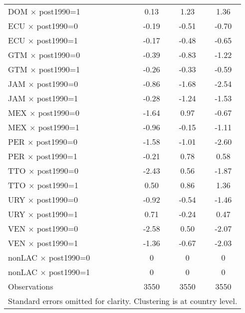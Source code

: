 \begin{table}[htbp]
\begin{tabular}{l*{3}{c}}
DOM $\times$ post1990=1&     0.13         &     1.23\sym{***}&     1.36\sym{***}\\
ECU $\times$ post1990=0&    -0.19         &    -0.51\sym{**} &    -0.70\sym{**} \\
ECU $\times$ post1990=1&    -0.17         &    -0.48\sym{**} &    -0.65\sym{***}\\
GTM $\times$ post1990=0&    -0.39\sym{*}  &    -0.83\sym{***}&    -1.22\sym{***}\\
GTM $\times$ post1990=1&    -0.26\sym{*}  &    -0.33         &    -0.59\sym{**} \\
JAM $\times$ post1990=0&    -0.86\sym{***}&    -1.68\sym{***}&    -2.54\sym{***}\\
JAM $\times$ post1990=1&    -0.28\sym{*}  &    -1.24\sym{***}&    -1.53\sym{***}\\
MEX $\times$ post1990=0&    -1.64\sym{***}&     0.97\sym{***}&    -0.67\sym{**} \\
MEX $\times$ post1990=1&    -0.96\sym{***}&    -0.15         &    -1.11\sym{***}\\
PER $\times$ post1990=0&    -1.58\sym{***}&    -1.01\sym{***}&    -2.60\sym{***}\\
PER $\times$ post1990=1&    -0.21         &     0.78\sym{***}&     0.58\sym{**} \\
TTO $\times$ post1990=0&    -2.43\sym{***}&     0.56\sym{***}&    -1.87\sym{***}\\
TTO $\times$ post1990=1&     0.50\sym{***}&     0.86\sym{***}&     1.36\sym{***}\\
URY $\times$ post1990=0&    -0.92\sym{***}&    -0.54\sym{***}&    -1.46\sym{***}\\
URY $\times$ post1990=1&     0.71\sym{***}&    -0.24         &     0.47\sym{**} \\
VEN $\times$ post1990=0&    -2.58\sym{***}&     0.50\sym{**} &    -2.07\sym{***}\\
VEN $\times$ post1990=1&    -1.36\sym{***}&    -0.67\sym{***}&    -2.03\sym{***}\\
nonLAC $\times$ post1990=0&        0         &        0         &        0         \\
nonLAC $\times$ post1990=1&        0         &        0         &        0         \\
\midrule
Observations    &     3550         &     3550         &     3550         \\
\bottomrule
\multicolumn{4}{l}{\scriptsize Standard errors omitted for clarity. Clustering is at country level.}\\

\end{tabular}
\end{table}
